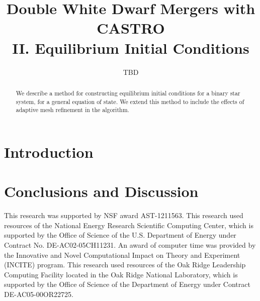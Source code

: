 \documentclass[iop]{../emulateapj}
\begin{document}
\title{Double White Dwarf Mergers with CASTRO\\ II. Equilibrium Initial Conditions}


\author{TBD}
\begin{abstract}
We describe a method for constructing equilibrium initial conditions for a binary star system,
for a general equation of state. We extend this method to include the effects of adaptive
mesh refinement in the algorithm.

\end{abstract}

\section{Introduction}

\cite{castro}


\section{Conclusions and Discussion}\label{Sec:Conclusions and Discussion}


\acknowledgments

This research was supported by NSF award AST-1211563.  This research
used resources of the National Energy Research Scientific Computing
Center, which is supported by the Office of Science of the
U.S. Department of Energy under Contract No. DE-AC02-05CH11231.  An
award of computer time was provided by the Innovative and Novel
Computational Impact on Theory and Experiment (INCITE) program.  This
research used resources of the Oak Ridge Leadership Computing Facility
located in the Oak Ridge National Laboratory, which is supported by
the Office of Science of the Department of Energy under Contract
DE-AC05-00OR22725.

\clearpage





\clearpage
\appendix
\end{document}
